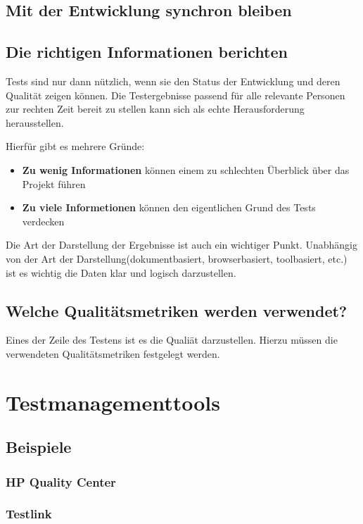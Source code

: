 \section{Mit der Entwicklung synchron bleiben}

\section{Die richtigen Informationen berichten}
Tests sind nur dann nützlich, wenn sie den Status der Entwicklung und deren Qualit\"at zeigen k\"onnen. Die Testergebnisse passend f\"ur alle relevante Personen zur rechten Zeit bereit zu stellen kann sich als echte Herausforderung herausstellen. 

Hierf\"ur gibt es mehrere Gr\"unde:
\begin{itemize}
	\item \textbf{Zu wenig Informationen} k\"onnen einem zu schlechten \"Uberblick \"uber das Projekt f\"uhren
	\item \textbf{Zu viele Informetionen} k\"onnen den eigentlichen Grund des Tests verdecken
\end{itemize}

Die Art der Darstellung der Ergebnisse ist auch ein wichtiger Punkt. Unabh\"angig von der Art der Darstellung(dokumentbasiert, browserbasiert, toolbasiert, etc.) ist es wichtig die Daten klar und logisch darzustellen.

\section{Welche Qualit\"atsmetriken werden verwendet?}
Eines der Zeile des Testens ist es die Quali\"at darzustellen. Hierzu m\"ussen die verwendeten Qualit\"atsmetriken festgelegt werden.


\chapter{Testmanagementtools}
\section{Beispiele}
\subsection{HP Quality Center}
\subsection{Testlink}
